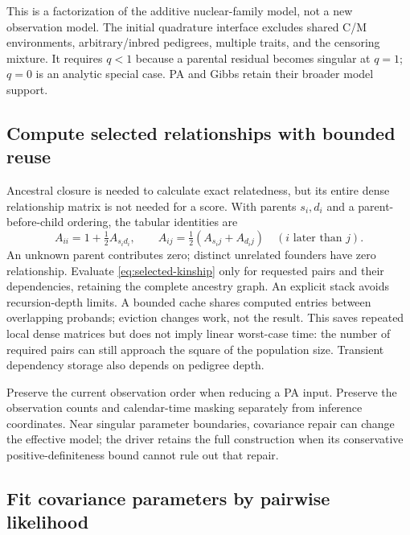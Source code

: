 This is a factorization of the additive nuclear-family model, not a new
observation model. The initial quadrature interface excludes shared
C/M environments, arbitrary/inbred pedigrees, multiple traits, and the
censoring mixture. It requires $q<1$ because a parental residual becomes
singular at $q=1$; $q=0$ is an analytic special case. PA and Gibbs retain
their broader model support.

\subsection{Compute selected relationships with bounded reuse}

Ancestral closure is needed to calculate exact relatedness, but its entire
dense relationship matrix is not needed for a score. With parents $s_i,d_i$
and a parent-before-child ordering, the tabular identities are
\begin{equation}
 A_{ii}=1+\tfrac12A_{s_i d_i},\qquad
 A_{ij}=\tfrac12(A_{s_i j}+A_{d_i j})\quad(i\text{ later than }j).
 \label{eq:selected-kinship}
\end{equation}
An unknown parent contributes zero; distinct unrelated founders have zero
relationship. Evaluate \eqref{eq:selected-kinship} only for requested pairs
and their dependencies, retaining the complete ancestry graph. An explicit
stack avoids recursion-depth limits. A bounded cache shares computed entries
between overlapping probands; eviction changes work, not the result.
This saves repeated local dense matrices but does not imply linear worst-case
time: the number of required pairs can still approach the square of the
population size. Transient dependency storage also depends on pedigree depth.

Preserve the current observation order when reducing a PA input. Preserve
the observation counts and calendar-time masking separately from inference
coordinates. Near singular parameter boundaries, covariance repair can
change the effective model; the driver retains the full construction when
its conservative positive-definiteness bound cannot rule out that repair.

\subsection{Fit covariance parameters by pairwise likelihood}
\label{sec:pairwise-theory}

